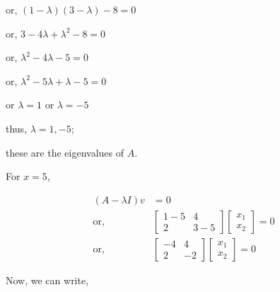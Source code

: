 \documentclass{article}
\begin{document}
    or,
    \((1 - \lambda)(3 - \lambda) - 8 = 0 \)

    or,
    \(3 - 4\lambda + \lambda^2 - 8 = 0 \)

    or,
    \( \lambda^2 - 4\lambda - 5 = 0 \)

    or,
    \( \lambda^2 - 5\lambda + \lambda - 5 = 0 \)

    or
    \( \lambda = 1 \) or \( \lambda = -5 \)

    \vspace{10pt}
    thus, \( \lambda = 1, -5 \); 

    these are the eigenvalues of \( A \).

    \newpage

    For \(x = 5\), 

    \[
    \begin{aligned}
        (A - \lambda I) v &= 0 \\
        \text{or,} \quad &\begin{bmatrix}
            1-5 & 4 \\
            2 & 3-5
        \end{bmatrix} \begin{bmatrix}
            x_1 \\
            x_2
        \end{bmatrix} = 0 \\
        \text{or,} \quad &\begin{bmatrix}
            -4 & 4 \\
            2 & -2
        \end{bmatrix} \begin{bmatrix}
            x_1 \\
            x_2
        \end{bmatrix} = 0
    \end{aligned}
    \]
    
    Now, we can write,
    
\end{document}
